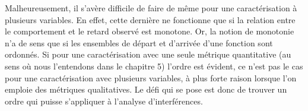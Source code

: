 Malheureusement, il s'avère difficile de faire de même pour une caractérisation à plusieurs variables.
En effet, cette dernière ne fonctionne que si la relation entre le comportement et le retard observé est monotone.
Or, la notion de monotonie n'a de sens que si les ensembles de départ et d'arrivée d'une fonction sont ordonnés.
Si pour une caractérisation avec une seule métrique quantitative (au sens où nous l'entendons dans le chapitre 5) l'ordre est évident, ce n'est pas le cas pour une caractérisation avec plusieurs variables, à plus forte raison lorsque l'on emploie des métriques qualitatives.
Le défi qui se pose est donc de trouver un ordre qui puisse s'appliquer à l'analyse d'interférences.




